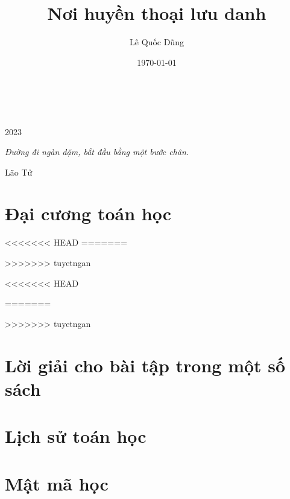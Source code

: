 \documentclass[oneside]{book}
\title{Nơi huyền thoại lưu danh}
\author{Lê Quốc Dũng}
\date{\today}
\begin{document}
\begin{titlepage}
		\\
			
		\vspace{10mm}
		\\
		\vspace{\fill}
		\centering \large{2023}
\end{titlepage}

\newpage

\vspace*{2cm}

\begin{center}
	{\Large 
			\textit{Đường đi ngàn dặm, bắt đầu bằng một bước chân.}
	}
	\Large{\parbox{10cm}{
		\begin{raggedleft}
		\vspace{.5cm}\hfill{Lão Tử}
		\end{raggedleft}
	}
}
\end{center}

\newpage

\tableofcontents

\newpage



\part{Đại cương toán học}


<<<<<<< HEAD
=======

>>>>>>> tuyetngan



%


<<<<<<< HEAD

=======


>>>>>>> tuyetngan

\part{Lời giải cho bài tập trong một số sách}



\part{Lịch sử toán học}


\part{Mật mã học}


\medskip


\end{document}
